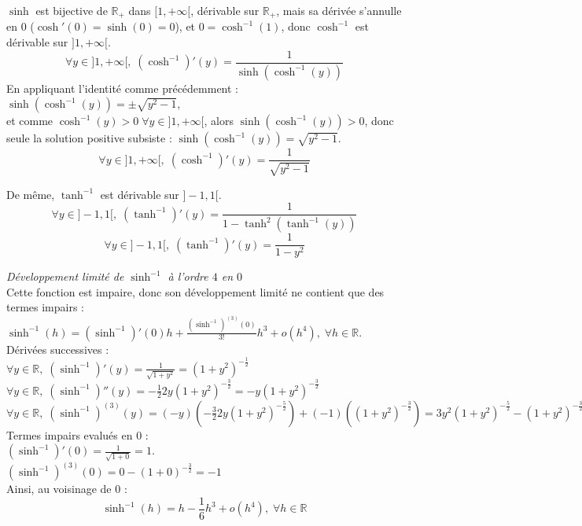 \documentclass[10pt,a4paper]{article}
\begin{document}
\bigskip
{}

$\sinh$ est bijective de $\mathbb{R}_+$ dans $[1,+\infty[$, dérivable sur $\mathbb{R}_+$, mais sa
dérivée s'annulle en 0 ($\cosh'(0) = \sinh(0) = 0$), et $0 = \cosh^{-1}(1)$, donc $\cosh^{-1}$ est
dérivable sur $]1,+\infty[$.\\
$$\forall y \in ]1,+\infty[, \; (\cosh^{-1})'(y) = \frac{1}{\sinh(\cosh^{-1}(y))}$$
En appliquant l'identité comme précédemment : $\sinh(\cosh^{-1}(y)) = \pm \sqrt{y^2-1}$,\\ et comme
$\cosh^{-1}(y) > 0 \; \forall y \in ]1, +\infty[$, alors $\sinh(\cosh^{-1}(y)) > 0$, donc seule la
solution positive subsiste : $\sinh(\cosh^{-1}(y)) = \sqrt{y^2-1}$.\\
$$\forall y \in ]1,+\infty[, \; (\cosh^{-1})'(y) = \frac{1}{\sqrt{y^2-1}}$$

\bigskip
{}

De même, $\tanh^{-1}$ est dérivable sur $]-1,1[$.\\
$$\forall y \in ]-1,1[, \; (\tanh^{-1})'(y) = \frac{1}{1 - \tanh^2(\tanh^{-1}(y))}$$
$$\forall y \in ]-1,1[, \; (\tanh^{-1})'(y) = \frac{1}{1 - y^2}$$

\q \emph{Développement limité de $\sinh^{-1}$ à l'ordre $4$ en $0$}\\
Cette fonction est impaire, donc son développement limité ne contient que des termes impairs :\\
$\sinh^{-1}(h) =  (\sinh^{-1})'(0) h +\frac{(\sinh^{-1})^{(3)}(0)}{3 !}h^3 +  o(h^4), \; \forall h
\in \mathbb{R}$. \\
Dérivées successives : \\
$\forall y \in \mathbb{R}, \; (\sinh^{-1})'(y) = \frac{1}{\sqrt{1 + y^2}} = (1 +
y^2)^{-\frac{1}{2}}$\\
$\forall y \in \mathbb{R}, \; (\sinh^{-1})''(y) = -\frac{1}{2}2y(1 + y^2)^{-\frac{3}{2}} = -y(1 +
y^2)^{-\frac{3}{2}}$\\
$\forall y \in \mathbb{R}, \; (\sinh^{-1})^{(3)}(y) = (-y)\left(-\frac{3}{2}2y(1 +
y^2)^{-\frac{5}{2}}\right) + (-1)\left((1 + y^2)^{-\frac{3}{2}}\right) = 3y^2(1 +
y^2)^{-\frac{5}{2}} - (1 + y^2)^{-\frac{3}{2}}$\\
Termes impairs evalués en $0$ :\\
$(\sinh^{-1})'(0) = \frac{1}{\sqrt{1 + 0}} = 1$.\\
$(\sinh^{-1})^{(3)}(0) = 0 - (1 + 0)^{-\frac{3}{2}} = -1$\\
Ainsi, au voisinage de $0$ :
$$\sinh^{-1}(h) = h - \frac{1}{6}h^3 + o(h^4), \; \forall h \in
\mathbb{R}$$
\end{document}
